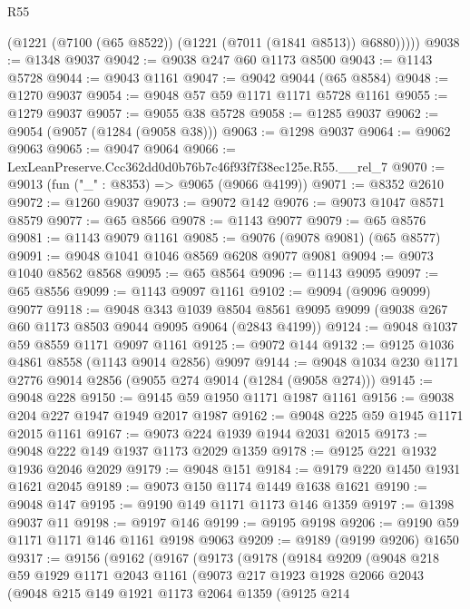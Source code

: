 \begin{lexlean}{R55}
\begin{coremodule}
          (@1221 (@7100 (@65 @8522)) (@1221 (@7011 (@1841 @8513)) @6880)))))
@9038 := @1348 @9037
@9042 := @9038 @247 @60 @1173 @8500
@9043 := @1143 @5728
@9044 := @9043 @1161
@9047 := @9042 @9044 (@65 @8584)
@9048 := @1270 @9037
@9054 := @9048 @57 @59 @1171 @1171 @5728 @1161
@9055 := @1279 @9037
@9057 := @9055 @38 @5728
@9058 := @1285 @9037
@9062 := @9054 (@9057 (@1284 (@9058 @38)))
@9063 := @1298 @9037
@9064 := @9062 @9063
@9065 := @9047 @9064
@9066 := LexLeanPreserve.Ccc362dd0d0b76b7c46f93f7f38ec125e.R55.__rel_7
@9070 := @9013 (fun ("_" : @8353) => @9065 (@9066 @4199))
@9071 := @8352 @2610
@9072 := @1260 @9037
@9073 := @9072 @142
@9076 := @9073 @1047 @8571 @8579
@9077 := @65 @8566
@9078 := @1143 @9077
@9079 := @65 @8576
@9081 := @1143 @9079 @1161
@9085 := @9076 (@9078 @9081) (@65 @8577)
@9091 := @9048 @1041 @1046 @8569 @6208 @9077 @9081
@9094 := @9073 @1040 @8562 @8568
@9095 := @65 @8564
@9096 := @1143 @9095
@9097 := @65 @8556
@9099 := @1143 @9097 @1161
@9102 := @9094 (@9096 @9099) @9077
@9118 := @9048
    @343
    @1039
    @8504
    @8561
    @9095
    @9099
    (@9038 @267 @60 @1173 @8503 @9044 @9095 @9064 (@2843 @4199))
@9124 := @9048 @1037 @59 @8559 @1171 @9097 @1161
@9125 := @9072 @144
@9132 := @9125 @1036 @4861 @8558 (@1143 @9014 @2856) @9097
@9144 := @9048 @1034 @230 @1171 @2776 @9014 @2856 (@9055 @274 @9014 (@1284 (@9058 @274)))
@9145 := @9048 @228
@9150 := @9145 @59 @1950 @1171 @1987 @1161
@9156 := @9038 @204 @227 @1947 @1949 @2017 @1987
@9162 := @9048 @225 @59 @1945 @1171 @2015 @1161
@9167 := @9073 @224 @1939 @1944 @2031 @2015
@9173 := @9048 @222 @149 @1937 @1173 @2029 @1359
@9178 := @9125 @221 @1932 @1936 @2046 @2029
@9179 := @9048 @151
@9184 := @9179 @220 @1450 @1931 @1621 @2045
@9189 := @9073 @150 @1174 @1449 @1638 @1621
@9190 := @9048 @147
@9195 := @9190 @149 @1171 @1173 @146 @1359
@9197 := @1398 @9037 @11
@9198 := @9197 @146
@9199 := @9195 @9198
@9206 := @9190 @59 @1171 @1171 @146 @1161 @9198 @9063
@9209 := @9189 (@9199 @9206) @1650
@9317 := @9156
    (@9162
      (@9167
        (@9173
          (@9178
            (@9184
              @9209
              (@9048
                @218
                @59
                @1929
                @1171
                @2043
                @1161
                (@9073
                  @217
                  @1923
                  @1928
                  @2066
                  @2043
                  (@9048
                    @215
                    @149
                    @1921
                    @1173
                    @2064
                    @1359
                    (@9125
                      @214

\end{coremodule}
\end{lexlean}
